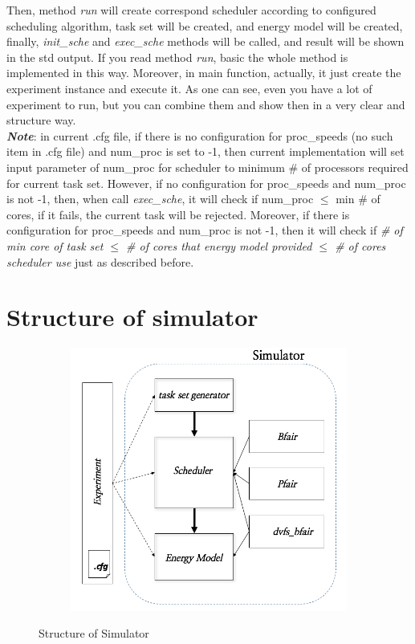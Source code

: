 \documentclass[11pt, oneside]{article}
\begin{document}
Then, method \textit{run} will create correspond scheduler according to configured scheduling algorithm, task set will be created, and energy model will be created, finally, \textit{init\_sche} and \textit{exec\_sche} methods will be called, and result will be shown in the std output. If you read method \textit{run}, basic the whole method is implemented in this way. Moreover, in main function, actually, it just create the experiment instance and execute it. As one can see, even you have a lot of experiment to run, but you can combine them and show then in a very clear and structure way.\\

 \textit{\textbf{Note}}: in current .cfg file, if there is no configuration for proc\_speeds (no such item in .cfg file) and num\_proc is set to -1, then current implementation will set input parameter of num\_proc for scheduler to minimum \# of processors required for current task set. However, if no configuration for proc\_speeds and num\_proc is not -1, then, when call \textit{exec\_sche}, it will check if num\_proc $\leq$ min \# of cores, if it fails, the current task will be rejected. Moreover, if there is configuration for proc\_speeds and num\_proc is not -1, then it will check if \textit{\# of min core of task set $\leq$ \# of cores that energy model provided $\leq$ \# of cores scheduler use } just as described before.
 
\section{Structure of simulator}
\begin{figure}[h]
\centering
	\begin{subfigure}[h]{0.5\textwidth}
		\includegraphics[width=\textwidth]{figure}
	\end{subfigure}%
\caption{Structure of Simulator}
\label{struct of simulator}
\end{figure}
\end{document}
